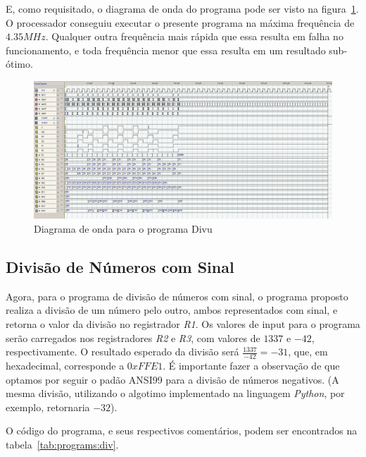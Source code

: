 \documentclass[12pt]{article}
\begin{document}
E, como requisitado, o diagrama de onda do programa pode ser visto na
figura~\ref{fig:program__divu_wave.png}. O processador conseguiu executar o
presente programa na máxima frequência de $4.35MHz$. Qualquer outra frequência
mais rápida que essa resulta em falha no funcionamento, e toda frequência menor
que essa resulta em um resultado sub-ótimo.

\begin{figure}[H]
    \centering
    \includegraphics[width=.9\textwidth]{Projeto/images/program__divu_wave.png}
    \caption{Diagrama de onda para o programa Divu}\label{fig:program__divu_wave.png}
\end{figure}


\subsection{Divisão de Números com Sinal}\label{sec:programs:div}

Agora, para o programa de divisão de números com sinal, o programa proposto
realiza a divisão de um número pelo outro, ambos representados com sinal, e
retorna o valor da divisão no registrador \emph{R1}. Os valores de input para o
programa serão carregados nos registradores \emph{R2} e \emph{R3}, com valores
de $1337$ e $-42$, respectivamente. O resultado esperado da divisão será
$\frac{1337}{-42} = -31$, que, em hexadecimal, corresponde a $0xFFE1$. É
importante fazer a observação de que optamos por seguir o padão ANSI99 para a
divisão de números negativos. (A mesma divisão, utilizando o algotimo
implementado na linguagem \emph{Python}, por exemplo, retornaria $-32$).

O código do programa, e seus respectivos comentários, podem ser encontrados na
tabela~\ref{tab:programs:div}.
\end{document}
